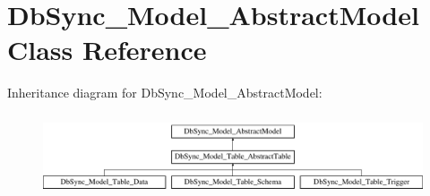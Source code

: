 \hypertarget{classDbSync__Model__AbstractModel}{
\section{DbSync\_\-Model\_\-AbstractModel Class Reference}
\label{classDbSync__Model__AbstractModel}
}
Inheritance diagram for DbSync\_\-Model\_\-AbstractModel:\begin{figure}[H]
\begin{center}
\leavevmode
\includegraphics[height=2.434783cm]{classDbSync__Model__AbstractModel}
\end{center}
\end{figure}
